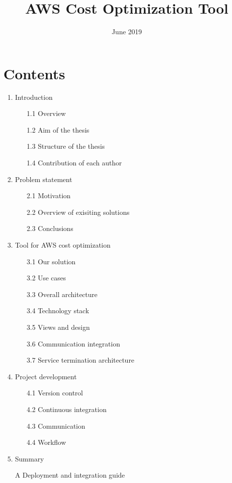\documentclass[licencjacka,en]{thesisclass}
\title{AWS Cost Optimization Tool}
\date{June 2019}
\begin{document}
    \maketitle

    \begin{abstract}
        
    \end{abstract}

    \chapter*{Contents}

    \begin{enumerate}
        \item Introduction
        \begin{enumerate}
            \item [1.1] Overview
            \item [1.2] Aim of the thesis
            \item [1.3] Structure of the thesis
            \item [1.4] Contribution of each author
        \end{enumerate}
        \item Problem statement
        \begin{enumerate}
            \item [2.1] Motivation
            \item [2.2] Overview of exisiting solutions
            \item [2.3] Conclusions
        \end{enumerate}
        \item Tool for AWS cost optimization
        \begin{enumerate}
            \item [3.1] Our solution
            \item [3.2] Use cases
            \item [3.3] Overall architecture
            \item [3.4] Technology stack
            \item [3.5] Views and design
            \item [3.6] Communication integration
            \item [3.7] Service termination architecture
        \end{enumerate}
        \item Project development
        \begin{enumerate}
            \item [4.1] Version control
            \item [4.2] Continuous integration
            \item [4.3] Communication
            \item [4.4] Workflow
        \end{enumerate}
        \item Summary
        \item [A] Deployment and integration guide
    \end{enumerate}
\end{document}
